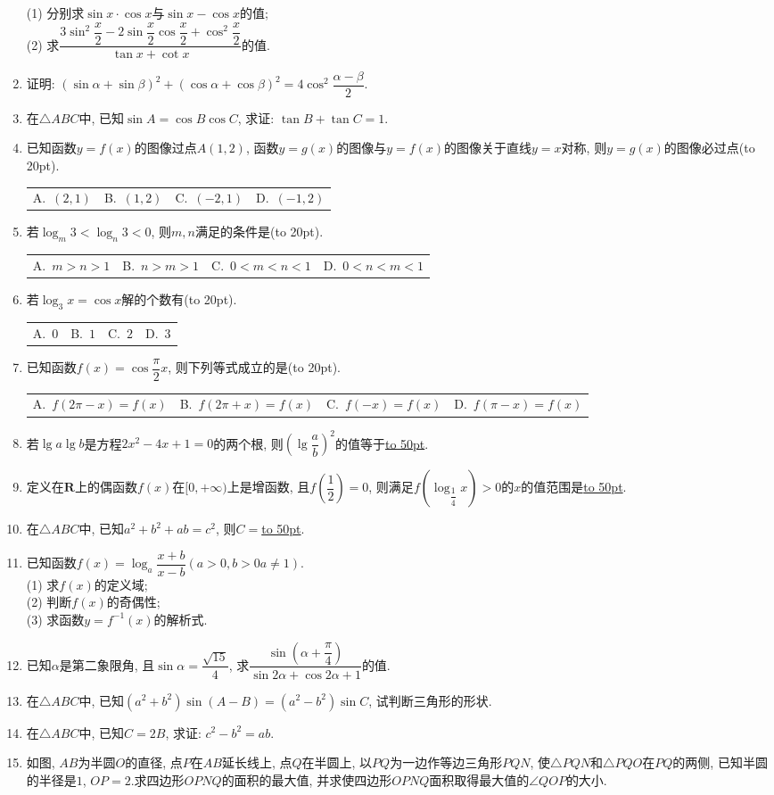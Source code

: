 \documentclass[10pt,a4paper]{article}
\newcommand{\blank}[1]{\underline{\hbox to #1pt{}}}
\newcommand{\bracket}[1]{(\hbox to #1pt{})}
\newcommand{\fourch}[4]{\par\begin{tabular}{p{.23\textwidth}p{.23\textwidth}p{.23\textwidth}p{.23\textwidth}}
A.~#1 &B.~#2& C.~#3& D.~#4
\end{tabular}}
\begin{document}
\begin{enumerate}[1.]
(1) 分别求$\sin x\cdot \cos x$与$\sin x-\cos x$的值;\\
(2) 求$\dfrac{3\sin ^2\dfrac x2-2\sin \dfrac x2\cos \dfrac x2+\cos ^2\dfrac x2}{\tan x+\cot x}$的值.
\item 证明: $(\sin \alpha +\sin \beta)^2+(\cos \alpha +\cos \beta)^2=4\cos ^2\dfrac{\alpha -\beta}2$.
\item 在$\triangle ABC$中, 已知$\sin A=\cos B\cos C$, 求证: $\tan B+\tan C=1$.
\item 已知函数$y=f(x)$的图像过点$A(1,2)$, 函数$y=g(x)$的图像与$y=f(x)$的图像关于直线$y=x$对称, 则$y=g(x)$的图像必过点\bracket{20}.
\fourch{$(2,1)$}{$(1,2)$}{$(-2,1)$}{$(-1,2)$}
\item 若$\log_m 3<\log_n 3<0$, 则$m,n$满足的条件是\bracket{20}.
\fourch{$m>n>1$}{$n>m>1$}{$0<m<n<1$}{$0<n<m<1$}
\item 若$\log _3x=\cos x$解的个数有\bracket{20}.
\fourch{$0$}{$1$}{$2$}{$3$}
\item 已知函数$f(x)=\cos \dfrac{\pi}2x$, 则下列等式成立的是\bracket{20}.
\fourch{$f(2\pi-x)=f(x)$}{$f(2\pi+x)=f(x)$}{$f(-x)=f(x)$}{$f(\pi-x)=f(x)$}
\item 若$\lg a\lg b$是方程$2x^2-4x+1=0$的两个根, 则$(\lg \dfrac ab)^2$的值等于\blank{50}.
\item 定义在$\mathbf{R}$上的偶函数$f(x)$在$[0,+\infty)$上是增函数, 且$f(\dfrac 12)=0$, 则满足$f(\log _{\dfrac 14}x)>0$的$x$的值范围是\blank{50}.
\item 在$\triangle ABC$中, 已知$a^2+b^2+ab=c^2$, 则$C=$\blank{50}.
\item 已知函数$f(x)=\log _a\dfrac{x+b}{x-b}(a>0,b>0a\ne 1)$.\\
(1) 求$f(x)$的定义域;\\
(2) 判断$f(x)$的奇偶性;\\
(3) 求函数$y=f^{-1}(x)$的解析式.
\item 已知$\alpha$是第二象限角, 且$\sin \alpha =\dfrac{\sqrt {15}}4$, 求$\dfrac{\sin (\alpha +\dfrac{\pi}4)}{\sin 2\alpha +\cos 2\alpha +1}$的值.
\item 在$\triangle ABC$中, 已知$(a^2+b^2)\sin (A-B)=(a^2-b^2)\sin C$, 试判断三角形的形状.
\item 在$\triangle ABC$中, 已知$C=2B$, 求证: $c^2-b^2=ab$.
\item 如图, $AB$为半圆$O$的直径, 点$P$在$AB$延长线上, 点$Q$在半圆上, 以$PQ$为一边作等边三角形$PQN$, 使$\triangle PQN$和$\triangle PQO$在$PQ$的两侧, 已知半圆的半径是$1$, $OP=2$.求四边形$OPNQ$的面积的最大值, 并求使四边形$OPNQ$面积取得最大值的$\angle QOP$的大小.
\begin{center}

\end{center}
\end{enumerate}
\end{document}
